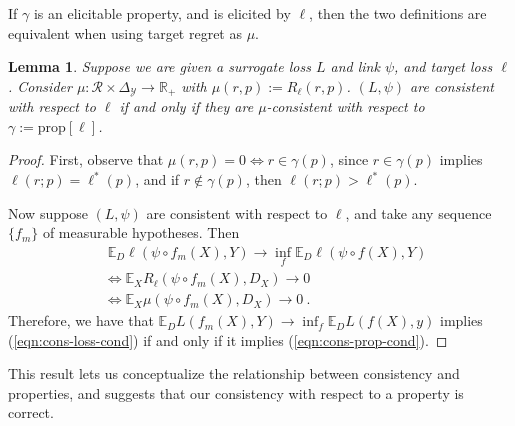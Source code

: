 \documentclass{article}
\newcommand{\reals}{\mathbb{R}}
\newcommand{\simplex}{\Delta_\Y}
\newcommand{\prop}[1]{\mathrm{prop}[#1]}
\newcommand{\propdis}{\mu}
\newcommand{\E}{\mathbb{E}}
\newcommand{\R}{\mathcal{R}}
\newcommand{\Y}{\mathcal{Y}}
\newcommand{\risk}[1]{#1^*}
\newtheorem{lemma}{Lemma}
\begin{document}


If $\gamma$ is an elicitable property, and is elicited by $\ell$, then the two definitions are equivalent when using target regret as $\propdis$.
\begin{lemma}\label{lem:consistent-loss-implies-prop}
	Suppose we are given a surrogate loss $L$ and link $\psi$, and target loss $\ell$.
	Consider $\propdis: \R \times \simplex \to \reals_+$ with $\mu(r,p) := R_\ell(r,p)$.
	$(L, \psi)$ are consistent with respect to $\ell$ if and only if they are $\propdis$-consistent with respect to $\gamma := \prop{\ell}$.
\end{lemma}
\begin{proof}
	First, observe that $\propdis(r,p) = 0 \iff r \in \gamma(p)$, since $r \in \gamma(p)$ implies $\ell(r;p) = \risk{\ell}(p)$, and if $r \not \in \gamma(p)$, then $\ell(r;p) > \risk{\ell}(p)$.
	
	Now suppose $(L, \psi)$ are consistent with respect to $\ell$, and take any sequence $\{f_m\}$ of measurable hypotheses.
        Then
        \begin{align}
	  &\; \E_D \ell(\psi \circ f_m(X), Y)\to \inf_f \E_D \ell(\psi \circ f(X), Y)   \label{eqn:cons-loss-cond} \\
	  &\iff \E_X R_\ell(\psi \circ f_m(X), D_X) \to 0                               \nonumber  \\
	  &\iff \E_X \propdis(\psi \circ f_m(X), D_X) \to 0~.~                          \label{eqn:cons-prop-cond}
	\end{align}
        Therefore, we have that $\mathbb{E}_D L(f_m(X),Y) \to \inf_f \mathbb{E}_D L(f(X),y)$ implies (\ref{eqn:cons-loss-cond}) if and only if it implies (\ref{eqn:cons-prop-cond}).
\end{proof}

This result lets us conceptualize the relationship between consistency and properties, and suggests that our consistency with respect to a property is correct.
\end{document}
